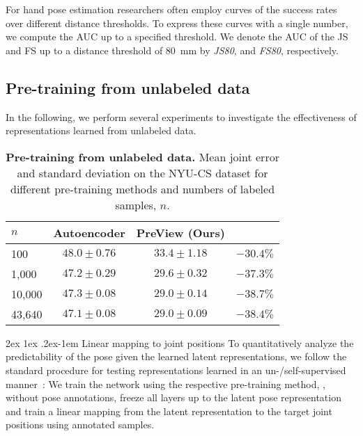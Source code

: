 \documentclass[10pt,twocolumn,letterpaper]{article}
\makeatletter
\renewcommand{\paragraph}{%
  \@startsection{paragraph}{4}%
  {\z@}{2ex \@plus 1ex \@minus .2ex}{-1em}%
  {\normalfont\normalsize\bfseries}%
}
\makeatother
\begin{document}
For hand pose estimation researchers often employ
curves of the success rates over different distance thresholds.
To express these curves with a single number, we compute the \ac{AUC} 
up to a specified threshold.
We denote the \ac{AUC} of the JS and FS 
up to a distance threshold of \SI{80}{\milli\meter} 
by \emph{JS80}, and \emph{FS80}, respectively.

\subsection{Pre-training from unlabeled data}\label{sec:exp:unsupervised}

In the following, we perform several experiments 
to investigate the effectiveness of representations learned from unlabeled data. 

\begin{table}[t]
\begin{center}
\begin{tabular}{l c c c}
\toprule
$n$ & Autoencoder & \textbf{PreView (Ours)} \\ 
\midrule
100 & $48.0 \pm 0.76$ & $\mathbf{33.4} \pm 1.18$ & $-30.4\%$ \\ 
1,000 & $47.2 \pm 0.29$ & $\mathbf{29.6} \pm 0.32$ & $-37.3\%$ \\ 
10,000 & $47.3 \pm 0.08$ & $\mathbf{29.0} \pm 0.14$ & $-38.7\%$ \\ 
43,640 & $47.1 \pm 0.08$ & $\mathbf{29.0} \pm 0.09$ & $-38.4\%$ \\ 
\bottomrule
\end{tabular}
\end{center}
\caption{
  \textbf{Pre-training from unlabeled data.}
  Mean joint error and standard deviation on the NYU-CS dataset 
  for different pre-training methods and numbers of labeled samples, $n$.
  }
\label{tab:unsupervised}
\end{table}\paragraph{Linear mapping to joint positions}\label{sec:exp:pretrain}
To quantitatively analyze the predictability of the pose 
given the learned latent representations,
we follow the standard procedure for testing representations learned in an un-/self-supervised 
manner~\cite{Coates2011aistats_singlelayerunsupervised,Dosovitskiy14nips,
Noroozi2017iccv_learntocount,Zhang2016eccv_colorful}:
We train the network using the respective pre-training method, 
\ie, without pose annotations, 
freeze all layers up to the latent pose representation 
and train a linear mapping from the latent representation 
to the target joint positions using annotated samples.
\end{document}
